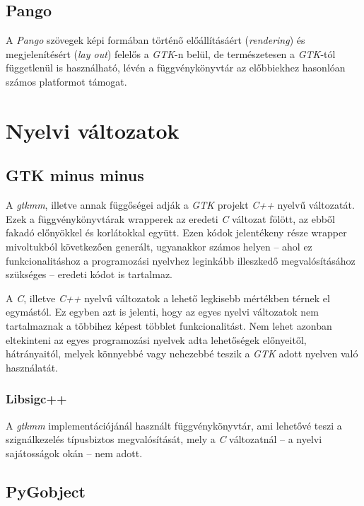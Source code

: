 \subsection{Pango}

A \textit{Pango} szövegek képi formában történő előállításáért (\textit{rendering}) és megjelenítésért (\textit{lay out}) felelős a \textit{GTK}-n belül, de természetesen a \textit{GTK}-tól függetlenül is használható, lévén a függvénykönyvtár az előbbiekhez hasonlóan számos platformot támogat.

\section{Nyelvi változatok}
\label{sec:otherlanguages}

\subsection{GTK minus minus}

A \textit{gtkmm}, illetve annak függőségei adják a \textit{GTK} projekt \textit{C++} nyelvű változatát. Ezek a függvénykönyvtárak wrapperek az eredeti \textit{C} változat fölött, az ebből fakadó előnyökkel és korlátokkal együtt. Ezen kódok jelentékeny része wrapper mivoltukból következően generált, ugyanakkor számos helyen -- ahol ez funkcionalitáshoz a programozási nyelvhez leginkább illeszkedő megvalósításához szükséges -- eredeti kódot is tartalmaz.

A \textit{C}, illetve \textit{C++} nyelvű változatok a lehető legkisebb mértékben térnek el egymástól. Ez egyben azt is jelenti, hogy az egyes nyelvi változatok nem tartalmaznak a többihez képest többlet funkcionalitást. Nem lehet azonban eltekinteni az egyes programozási nyelvek adta lehetőségek előnyeitől, hátrányaitól, melyek könnyebbé vagy nehezebbé teszik a \textit{GTK} adott nyelven való használatát.

\subsubsection{Libsigc++}

A \textit{gtkmm} implementációjánál használt függvénykönyvtár, ami lehetővé teszi a szignálkezelés típusbiztos megvalósítását, mely a \textit{C} változatnál -- a nyelvi sajátosságok okán -- nem adott.

\subsection{PyGobject}

